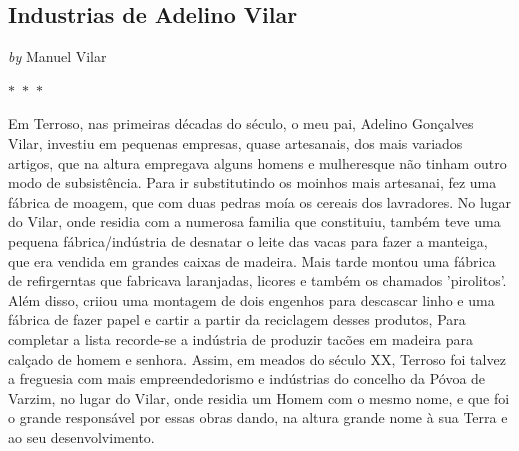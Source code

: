 \begin{center}

    \section{  Industrias de Adelino Vilar  }

    
            
                \textit{by} Manuel Vilar
            
        

     
    
    

$\ast$~$\ast$~$\ast$



\end{center}

\begin{center}
    \begin{minipage}{0.9\textwidth}
        \setlength{\parskip}{0.2cm}
        \setlength{\parindent}{0cm}
        \fontsize{12pt}{14pt}\selectfont
        


Em Terroso, nas primeiras décadas do século, o meu pai, Adelino
Gonçalves Vilar, investiu em pequenas empresas, quase artesanais, dos
mais variados artigos, que na altura empregava alguns homens e
mulheresque não tinham outro modo de subsistência. Para ir substitutindo
os moinhos mais artesanai, fez uma fábrica de moagem, que com duas
pedras moía os cereais dos lavradores. No lugar do Vilar, onde residia
com a numerosa familia que constituiu, também teve uma pequena
fábrica/indústria de desnatar o leite das vacas para fazer a manteiga,
que era vendida em grandes caixas de madeira. Mais tarde montou uma
fábrica de refirgerntas que fabricava laranjadas, licores e também os
chamados 'pirolitos'. Além disso, criiou uma montagem de dois engenhos
para descascar linho e uma fábrica de fazer papel e cartir a partir da
reciclagem desses produtos, Para completar a lista recorde-se a
indústria de produzir tacões em madeira para calçado de homem e senhora.
Assim, em meados do século XX, Terroso foi talvez a freguesia com mais
empreendedorismo e indústrias do concelho da Póvoa de Varzim, no lugar
do Vilar, onde residia um Homem com o mesmo nome, e que foi o grande
responsável por essas obras dando, na altura grande nome à sua Terra e
ao seu desenvolvimento.

    \end{minipage}
\end{center}

